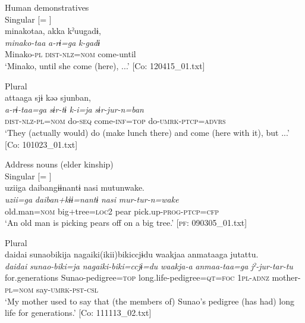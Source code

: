  Human demonstratives\\

\ex  Singular [= ]\\

{\TM}
\glll minakotaa,  akka  kˀuugadɨ,\\
      \textit{minako-taa}  \textit{a-rɨ=ga}  \textit{k-gadɨ}\\
      Minako-\textsc{pl}  \textsc{dist}-\textsc{nlz}=\textsc{nom}  come-until\\
\glt ‘Minako, until she come (here), ...’ [Co: 120415\_01.txt]
\z

\ex  Plural\\

{\TM}
\glll attaaga  sjɨ  kəə  sjunban,\\
      \textit{a-rɨ-taa=ga}  \textit{sɨr-tɨ}  \textit{k-i=ja}  \textit{sɨr-jur-n=ban}\\
      \textsc{dist}-\textsc{nlz}-\textsc{pl}=\textsc{nom}  do-\textsc{seq}  come-\textsc{inf}=\textsc{top}  do-\textsc{umrk}-\textsc{ptcp}=\textsc{advrs}\\
\glt ‘They (actually would) do (make lunch there) and come (here with it), but ...’ [Co: 101023\_01.txt]
\z

  Address nouns (elder kinship)\\

\ex  Singular [= ]\\

{\TM}
\glll uziiga  daibangɨɨnantɨ  nasi  mutunwake.\\
      \textit{uzii=ga}  \textit{daiban+kɨɨ=nantɨ}  \textit{nasi}  \textit{mur-tur-n=wake}\\
      old.man=\textsc{nom}  big+tree=\textsc{loc2}  pear  pick.up-\textsc{prog}-\textsc{ptcp}=\textsc{cfp}\\
\glt ‘An old man is picking pears off on a big tree.’ [\textsc{pf}: 090305\_01.txt]
\z

\ex  Plural\\

{\TM}
\glll daidai  sunaobikija  nagaiki(ikii)bikiccjɨdu    waakjaa  anmataaga  jutattu.\\
      \textit{daidai}  \textit{sunao-biki=ja}  \textit{nagaiki-biki=ccjɨ=du}   \textit{waakja-a}  \textit{anmaa-taa=ga}  \textit{jˀ-jur-tar-tu}\\
      for.generations  Sunao-pedigree=\textsc{top}  long.life-pedigree=\textsc{qt}=\textsc{foc}      1\textsc{pl}-\textsc{adnz}  mother-\textsc{pl}=\textsc{nom}  say-\textsc{umrk}-\textsc{pst}-\textsc{csl}\\
\glt ‘My mother used to say that (the members of) Sunao’s pedigree (has had) long life for generations.’ [Co: 111113\_02.txt]
\z

